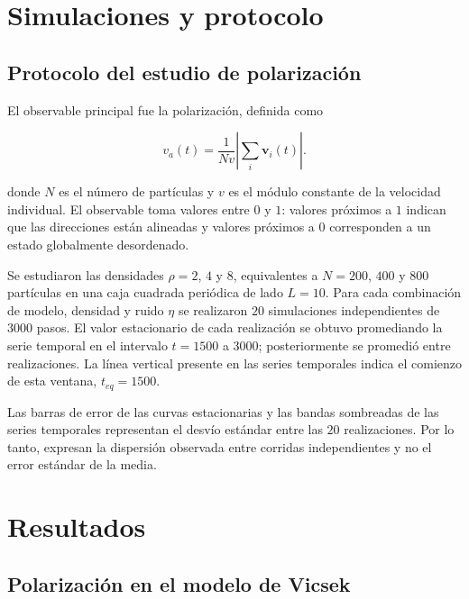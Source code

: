 \documentclass[11pt,a4paper]{article}
\renewcommand{\vec}[1]{\mathbf{#1}}
\begin{document}
\section{Simulaciones y protocolo}

\subsection{Protocolo del estudio de polarización}

El observable principal fue la polarización, definida como

\begin{equation}
v_a(t) = \frac{1}{N v} \left| \sum_i \vec{v}_i(t) \right|.
\label{eq:va}
\end{equation}

donde $N$ es el número de partículas y $v$ es el módulo constante de la velocidad individual. El observable toma valores entre $0$ y $1$: valores próximos a $1$ indican que las direcciones están alineadas y valores próximos a $0$ corresponden a un estado globalmente desordenado.

Se estudiaron las densidades $\rho = 2$, $4$ y $8$, equivalentes a $N = 200$, $400$ y $800$ partículas en una caja cuadrada periódica de lado $L = 10$. Para cada combinación de modelo, densidad y ruido $\eta$ se realizaron $20$ simulaciones independientes de $3000$ pasos. El valor estacionario de cada realización se obtuvo promediando la serie temporal en el intervalo $t = 1500$ a $3000$; posteriormente se promedió entre realizaciones. La línea vertical presente en las series temporales indica el comienzo de esta ventana, $t_{eq} = 1500$.

Las barras de error de las curvas estacionarias y las bandas sombreadas de las series temporales representan el desvío estándar entre las $20$ realizaciones. Por lo tanto, expresan la dispersión observada entre corridas independientes y no el error estándar de la media.

\section{Resultados}

\subsection{Polarización en el modelo de Vicsek}
\end{document}
